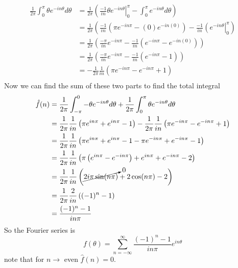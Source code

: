 \documentclass[11pt]{article}
\numberwithin{equation}{section}
\begin{document}
\begin{align*}
\frac{1}{2\pi}\int_{0}^{\pi}\theta e^{-in\theta}d\theta &= \frac{1}{2\pi}\left(\left.\frac{-1}{in}\theta e^{-in\theta}\right|_{0}^{\pi}-\int_{0}^{\pi}e^{-in\theta}d\theta \right)\\
&= \frac{1}{2\pi}\left(\frac{-1}{in}\left(\pi e^{-in\pi} - (0)e^{-in(0)}\right) - \frac{-1}{in}\left(e^{-in\theta}\right|_{0}^{\pi} \right)\\
&= \frac{1}{2\pi}\left(\frac{-\pi}{in} e^{-in\pi} - \frac{-1}{in}\left(e^{-in\pi} - e^{-in(0)}\right)\right)\\
&= \frac{1}{2\pi}\left(\frac{-\pi}{in} e^{-in\pi} - \frac{-1}{in}\left(e^{-in\pi} - 1\right)\right)\\
&= -\frac{1}{2\pi}\frac{1}{in}\left(\pi e^{-in\pi} - e^{-in\pi} + 1\right)\\
\end{align*}
Now we can find the sum of these two parts to find the total integral
\begin{align*}
\hat{f}(n) &= \frac{1}{2\pi}\int_{-\pi}^{0}-\theta e^{-in\theta}d\theta + \frac{1}{2\pi}\int_{0}^{\pi}\theta e^{-in\theta}d\theta\\
&= \frac{1}{2\pi}\frac{1}{in}\left(\pi e^{in\pi}+ e^{in\pi}- 1 \right) - \frac{1}{2\pi}\frac{1}{in}\left(\pi e^{-in\pi} - e^{-in\pi} + 1\right)\\
&= \frac{1}{2\pi}\frac{1}{in}\left(\pi e^{in\pi}+ e^{in\pi}- 1 - \pi e^{-in\pi} + e^{-in\pi} - 1\right)\\
&= \frac{1}{2\pi}\frac{1}{in}\left(\pi \left(e^{in\pi}-e^{-in\pi}\right) + e^{in\pi} + e^{-in\pi} - 2\right)\\
&= \frac{1}{2\pi}\frac{1}{in}\left(\cancelto{0}{2i\pi\sin(n\pi)} + 2\cos(n\pi) - 2\right)\\
&= \frac{1}{2\pi}\frac{2}{in}\left((-1)^n - 1\right)\\
&= \frac{(-1)^n - 1}{in\pi}
\end{align*}
So the Fourier series is 
$$f(\theta) = \sum_{n=-\infty}^{\infty}\frac{(-1)^n - 1}{in\pi}e^{in\theta}$$
note that for $n\rightarrow$ even $\hat{f}(n) = 0$.
\end{document}
